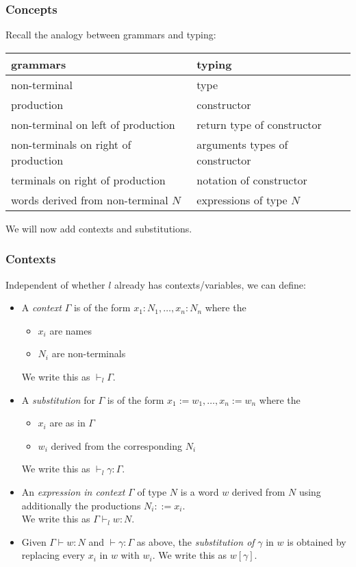 \begin{frame}\frametitle{Concepts}
Recall the analogy between grammars and typing:

\begin{center}
\begin{tabular}{l|l}
grammars & typing \\
\hline
non-terminal & type \\
production & constructor \\
non-terminal on left of production & return type of constructor \\
non-terminals on right of production & arguments types of constructor \\
terminals on right of production & notation of constructor\\
words derived from non-terminal $N$ & expressions of type $N$
\end{tabular}
\end{center}

We will now add contexts and substitutions.
\end{frame}

\begin{frame}\frametitle{Contexts}
Independent of whether $l$ already has contexts/variables, we can define:
\begin{itemize}
 \item A \emph{context} $\Gamma$ is of the form $x_1:N_1,\ldots,x_n:N_n$ where the
  \begin{itemize}
   \item $x_i$ are names
   \item $N_i$ are non-terminals
  \end{itemize}
  We write this as $\vdash_l \Gamma$.
 \item A \emph{substitution} for $\Gamma$ is of the form $x_1:=w_1,\ldots,x_n:=w_n$ where the
  \begin{itemize}
   \item $x_i$ are as in $\Gamma$
   \item $w_i$ derived from the corresponding $N_i$
  \end{itemize}
  We write this as $\vdash_l \gamma:\Gamma$.
 \item An \emph{expression in context} $\Gamma$ of type $N$ is a word $w$ derived from $N$ using additionally the productions $N_i::= x_i$.\\
 We write this as $\Gamma\vdash_l w:N$.
 \item Given $\Gamma\vdash w:N$ and $\vdash \gamma:\Gamma$ as above, the \emph{substitution of} $\gamma$ in $w$ is obtained by replacing every $x_i$ in $w$ with $w_i$.
 We write this as $w[\gamma]$.
\end{itemize}
\end{frame}


